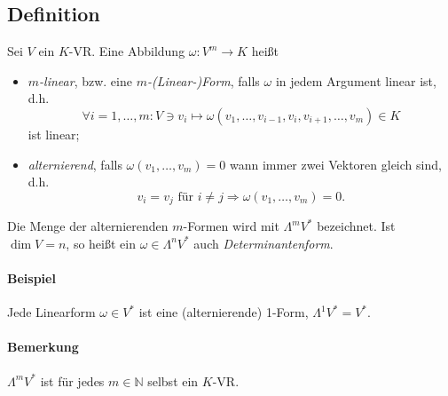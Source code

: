  \subsection{Definition}
 	\begin{Definition}
 		Sei $ V $ ein $ K $-VR. Eine Abbildung $ \omega:V^m\to K $ heißt
 		\begin{itemize}
 			\item \emph{$ m $-linear}, bzw. eine \emph{$ m $-(Linear-)Form}, falls $ \omega $ in jedem Argument linear ist, d.h.
 			      \[
 			      	\forall i=1,\dots, m: V\ni v_i\mapsto \omega(v_1,\dots,v_{i-1},v_i,v_{i+1},\dots,v_m)\in K
 			      \]
 			      ist linear;
 			\item \emph{alternierend}, falls $ \omega(v_1,\dots,v_m)=0 $ wann immer zwei Vektoren gleich sind, d.h.
 			      \[
 			      	v_i = v_j \text{ für } i\neq j \Rightarrow \omega(v_1,\dots, v_m) = 0.
 			      \]
 		\end{itemize}
 		Die Menge der alternierenden $ m $-Formen wird mit $ \Lambda^mV^* $ bezeichnet. Ist $ \dim V = n $, so heißt ein $ \omega\in \Lambda^nV^* $ auch \emph{Determinantenform}.
 	\end{Definition}

 	\paragraph{Beispiel}
 		Jede Linearform $ \omega\in V^* $ ist eine (alternierende) 1-Form, $ \Lambda^1V^*=V^* $.
 	\paragraph{Bemerkung}
 		$ \Lambda^mV^* $ ist für jedes $ m\in \mathbb{N} $ selbst ein $ K $-VR.
